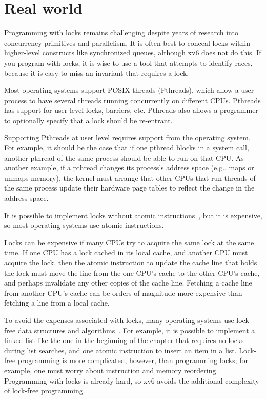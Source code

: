 \section{Real world}
Programming with locks remains challenging despite years of research
into concurrency primitives and parallelism.
It is often best to conceal locks within 
higher-level constructs like synchronized queues, although xv6 does not
do this.  If you program with locks, it is wise to use a tool that attempts to
identify races, because it is easy to miss an invariant that requires
a lock.

Most operating systems support POSIX threads (Pthreads), which allow a
user process to have several threads running concurrently on different
CPUs.  Pthreads has support for user-level locks, barriers, etc.
Pthreads also allows a programmer to optionally specify that a lock
should be re-entrant.

Supporting Pthreads at user level requires support from the operating
system. For example, it should be the case that if one pthread blocks
in a system call, another pthread of the same process should be able
to run on that CPU.  As another example, if a pthread changes its
process's address space (e.g., maps or unmaps memory), the kernel must
arrange that other CPUs that run threads of the same process update
their hardware page tables to reflect the change in the address space.

It is possible to implement locks without atomic
instructions~\cite{lamport:bakery}, but it is expensive, so most
operating systems use atomic instructions.

Locks can be expensive if many CPUs try to acquire the same lock
at the same time.  If one CPU has a lock
cached in its local cache, and another CPU must acquire the lock, then the
atomic instruction to update the cache line that holds the lock must move the line
from the one CPU's cache to the other CPU's cache, and perhaps
invalidate any other copies of the cache line.  Fetching a cache line from
another CPU's cache can be orders of magnitude more expensive than
fetching a line from a local cache.

To avoid the expenses associated with locks, many operating systems
use lock-free data structures and algorithms~\cite{herlihy:art,mckenney:rcuusage}.
For example, it is possible to implement a linked list like the one in
the beginning of the chapter that requires no locks during list
searches, and one atomic instruction to insert an item in a list.
Lock-free programming is more complicated, however, than programming
locks; for example, one must worry about instruction and memory
reordering.  Programming with locks is already hard, so xv6 avoids the
additional complexity of lock-free programming.

